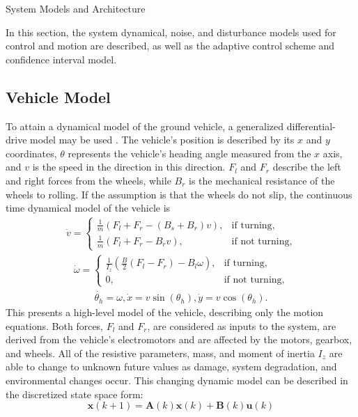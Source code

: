 \begin{section}{System Models and Architecture}
	
\label{sec:modeling}
In this section, the system dynamical, noise, and disturbance models used for control and motion are described, as well as the adaptive control scheme and confidence interval model.


\subsection{Vehicle Model}
To attain a dynamical model of the ground vehicle, a generalized differential-drive model may be used \cite{nutaro2011building}. The vehicle's position is described by its $x$ and $y$ coordinates, $\theta$ represents the vehicle's heading angle measured from the $x$ axis, and $v$ is the speed in the direction in this direction. $F_l$ and $F_r$ describe the left and right forces from the wheels, while $B_r$ is the mechanical resistance of the wheels to rolling. If the assumption is that the wheels do not slip, the continuous time dynamical model of the vehicle is
    \begin{align}
        \dot{v}=\begin{cases}
            \frac{1}{m}(F_l+F_r-(B_s+B_r)v), & \text{if turning},\\
            \frac{1}{m}(F_l+F_r-B_rv), & \text{if not turning},
        \end{cases}
    \end{align}
    \begin{align}
        \dot{\omega}=\begin{cases}
            \frac{1}{I_z}(\frac{B}{2}(F_l-F_r)-B_l\omega), &\text{if turning},\\
            0, & \text{if not turning},
        \end{cases}
	\end{align}
	\begin{align}
        \dot{\theta_h}=\omega, \dot{x}=v\sin(\theta_h), \dot{y}=v\cos(\theta_h).
	\end{align}
This presents a high-level model of the vehicle, describing only the motion equations. Both forces, $F_l$ and $F_r$, are considered as inputs to the system, are derived from the vehicle's electromotors and are affected by the motors, gearbox, and wheels. All of the resistive parameters, mass, and moment of inertia $I_z$ are able to change to unknown future values as damage, system degradation, and environmental changes occur. This changing dynamic model can be described in the discretized state space form:
    \begin{equation}
	\bm{x}(k+1) = \bm{A}(k)\bm{x}(k) + \bm{B}(k)\bm{u}(k)
	\end{equation}


\end{section}
